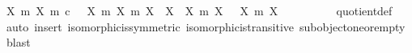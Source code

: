 \begin{isabellebody}
\ {\isachardoublequoteopen}{\isacharbraceleft}{\kern0pt}{\isacharparenleft}{\kern0pt}X{\isacharcomma}{\kern0pt}\ m{\isacharparenright}{\kern0pt}{\isachardot}{\kern0pt}\ {\isacharparenleft}{\kern0pt}X{\isacharcomma}{\kern0pt}\ m{\isacharparenright}{\kern0pt}\ {\isasymsubseteq}\isactrlsub c\ {\isasymone}{\isacharbraceright}{\kern0pt}\ {\isacharslash}{\kern0pt}{\isacharslash}{\kern0pt}\ {\isacharbraceleft}{\kern0pt}{\isacharparenleft}{\kern0pt}{\isacharparenleft}{\kern0pt}X{}{\isacharcomma}{\kern0pt}\ m{}{\isacharparenright}{\kern0pt}{\isacharcomma}{\kern0pt}\ {\isacharparenleft}{\kern0pt}X{}{\isacharcomma}{\kern0pt}\ m{}{\isacharparenright}{\kern0pt}{\isacharparenright}{\kern0pt}{\isachardot}{\kern0pt}\ X{}\ {\isasymcong}\ X{}{\isacharbraceright}{\kern0pt}\ {\isasymsubseteq}\ {\isacharbraceleft}{\kern0pt}{\isacharbraceleft}{\kern0pt}{\isacharparenleft}{\kern0pt}X{\isacharcomma}{\kern0pt}\ m{\isacharparenright}{\kern0pt}{\isachardot}{\kern0pt}\ X\ {\isasymcong}\ {\isasymemptyset}{\isacharbraceright}{\kern0pt}{\isacharcomma}{\kern0pt}\ {\isacharbraceleft}{\kern0pt}{\isacharparenleft}{\kern0pt}X{\isacharcomma}{\kern0pt}\ m{\isacharparenright}{\kern0pt}{\isachardot}{\kern0pt}\ X\ {\isasymcong}\ {\isasymone}{\isacharbraceright}{\kern0pt}{\isacharbraceright}{\kern0pt}{\isachardoublequoteclose}\isanewline
\ \ \ \ \ \ \isamarkupfalse%
\ quotient{\isacharunderscore}{\kern0pt}def\ \isamarkupfalse%
\ {\isacharparenleft}{\kern0pt}auto{\isacharcomma}{\kern0pt}\ insert\ isomorphic{\isacharunderscore}{\kern0pt}is{\isacharunderscore}{\kern0pt}symmetric\ isomorphic{\isacharunderscore}{\kern0pt}is{\isacharunderscore}{\kern0pt}transitive\ subobject{\isacharunderscore}{\kern0pt}one{\isacharunderscore}{\kern0pt}or{\isacharunderscore}{\kern0pt}empty{\isacharcomma}{\kern0pt}\ blast{\isacharplus}{\kern0pt}{\isacharparenright}{\kern0pt}\isanewline
\ \ \isamarkupfalse%
\isanewline
\ \ \ \ \isamarkupfalse%

\end{isabellebody}
